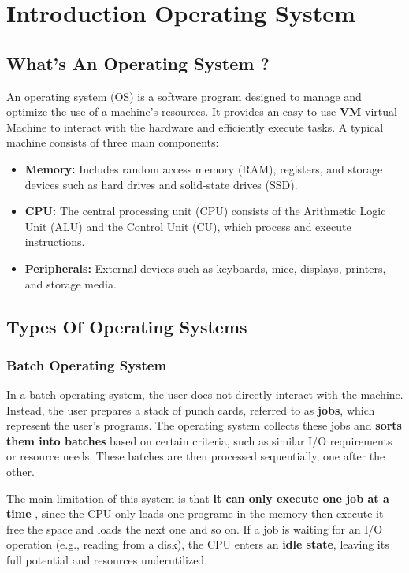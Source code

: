 \section{Introduction Operating System}
\subsection{What's An Operating System ?}
An operating system (OS) is a software program designed to manage and optimize the use of a machine's resources. 
It provides an easy to use \textbf{VM} virtual Machine to interact with the hardware and efficiently execute tasks. 
A typical machine consists of three main components:
\begin{itemize}
    \item \textbf{Memory:} Includes random access memory (RAM), registers, and storage devices such as 
        hard drives and solid-state drives (SSD).
    \item \textbf{CPU:} The central processing unit (CPU) consists of the Arithmetic Logic Unit (ALU) and 
        the Control Unit (CU), which process and execute instructions.
    \item \textbf{Peripherals:} External devices such as keyboards, mice, displays, printers, and storage media.
\end{itemize}
\subsection{Types Of Operating Systems}
\subsubsection{Batch Operating System}
In a batch operating system, the user does not directly interact with the machine. Instead, the user prepares a stack 
of punch cards, referred to as \textbf{jobs}, which represent the user's programs. The operating system collects these jobs and \textbf{sorts 
them into batches} based on certain criteria, such as similar I/O requirements or resource needs. These batches are then processed 
sequentially, one after the other.

The main limitation of this system is that \textbf{it can only execute one job at a time} , since the CPU only loads one programe in the memory 
then execute it free the space and loads the next one and so on. If a job is waiting for an I/O operation (e.g., reading from a disk), the CPU enters an 
\textbf{idle state}, leaving its full potential and resources underutilized.
